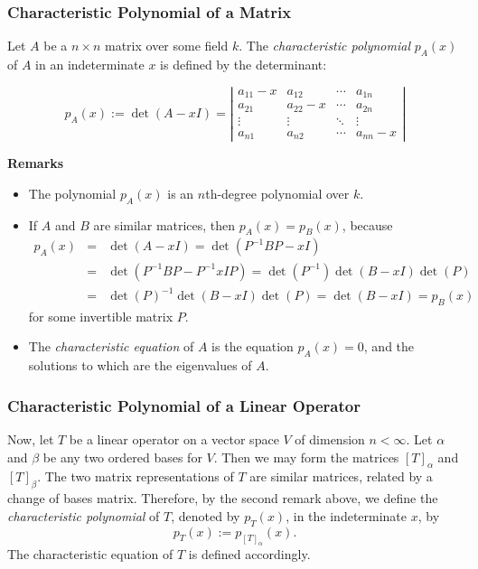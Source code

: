 \documentclass{article}
\begin{document}
\subsubsection*{Characteristic Polynomial of a Matrix}

Let $A$ be a $n \times n$ matrix over some field $k$.  The \emph{characteristic polynomial} $p_A(x)$ of $A$ in an indeterminate $x$ is defined by the determinant:

$$ p_A(x):=\det(A-x I) =
\left|\begin{matrix}
a_{11}-x & a_{12} & \cdots & a_{1n} \\
a_{21} & a_{22}-x & \cdots & a_{2n} \\
\vdots & \vdots & \ddots & \vdots \\
a_{n1} & a_{n2} & \cdots & a_{nn}-x
\end{matrix} \right|$$

\textbf{Remarks}
\begin{itemize}
\item
The polynomial $p_A(x)$ is an $n$th-degree polynomial over $k$.
\item
If $A$ and $B$ are similar matrices, then $p_A(x)=p_B(x)$, because 
\begin{eqnarray*}
p_A(x) &=& \det(A-xI) = \det(P^{-1}BP-xI) \\ &=& \det(P^{-1}BP-P^{-1}xIP) = \det(P^{-1})\det(B-xI)\det(P) \\ &=& \det(P)^{-1}\det(B-xI)\det(P)=\det(B-xI) = p_B(x)
\end{eqnarray*}
for some invertible matrix $P$.
\item
The \emph{characteristic equation} of $A$ is the equation $p_A(x)=0$, and the solutions to which are the eigenvalues of $A$.
\end{itemize}

\subsubsection*{Characteristic Polynomial of a Linear Operator}

Now, let $T$ be a linear operator on a vector space $V$ of dimension $n<\infty$.  Let $\alpha$ and $\beta$ be any two ordered bases for $V$.  Then we may form the matrices $[T]_{\alpha}$ and $[T]_{\beta}$.  The two matrix representations of $T$ are similar matrices, related by a change of bases matrix.  Therefore, by the second remark above, we define the \emph{characteristic polynomial} of $T$, denoted by $p_T(x)$, in the indeterminate $x$, by $$p_T(x):=p_{[T]_{\alpha}}(x).$$  The characteristic equation of $T$ is defined accordingly.
\end{document}
